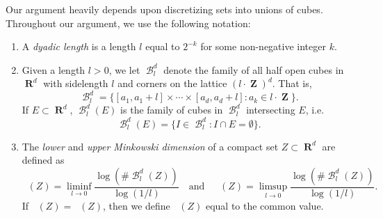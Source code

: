 \documentclass[dvipsnames,letterpaper,12pt]{article}
\numberwithin{equation}{section}
\theoremstyle{plain}
\DeclareMathOperator{\minkdim}{\dim_{\mathbf{M}}}
\DeclareMathOperator{\lowminkdim}{\underline{\dim}_{\mathbf{M}}}
\DeclareMathOperator{\upminkdim}{\overline{\dim}_{\mathbf{M}}}
\DeclareMathOperator{\RR}{\mathbf{R}}
\DeclareMathOperator{\ZZ}{\mathbf{Z}}
\DeclareMathOperator{\B}{\mathcal{B}}
\begin{document}
Our argument heavily depends upon discretizing sets into unions of cubes. Throughout our argument, we use the following notation:


\begin{enumerate}%
	\item A {\it dyadic length} is a length $l$ equal to $2^{-k}$ for some non-negative integer $k$.

	\item Given a length $l > 0$, we let $\B^d_l$  denote the family of all half open cubes in $\RR^d$ with sidelength $l$ and corners on the lattice $(l \cdot \ZZ)^d$. That is,
	\[ \B^d_l = \{ [a_1, a_1 + l] \times \cdots \times [a_d, a_d+l] : a_k \in l \cdot \ZZ \}. \]
	If $E \subset \RR^d$, $\B^d_l(E)$ is the family of cubes in $\B^d_l$ intersecting $E$, i.e.
	\[ \B^d_l(E) = \{ I \in \B^d_l: I \cap E = \emptyset \}. \]

	\item The {\it lower} and {\it upper Minkowski dimension} of a compact set $Z \subset \RR^d$ are defined as
	\[		\lowminkdim(Z) = \liminf_{l \to 0} \frac{\log(\# \B^d_l(Z))}{\log(1/l)}\quad \text{and}\quad \upminkdim(Z) = \limsup_{l \to 0} \frac{\log(\# \B^d_l(Z))}{\log(1/l)}. \]
	If $\lowminkdim(Z) = \upminkdim(Z)$, then we define $\minkdim(Z)$ equal to the common value.


\end{enumerate}
\end{document}
